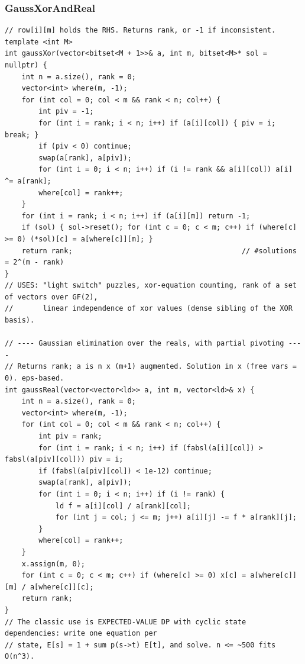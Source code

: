 \documentclass[9pt,a4paper,twocolumn]{extarticle}
\begin{document}
\filbreak
\subsubsection{GaussXorAndReal}
\nopagebreak
\begin{lstlisting}
// row[i][m] holds the RHS. Returns rank, or -1 if inconsistent.
template <int M>
int gaussXor(vector<bitset<M + 1>>& a, int m, bitset<M>* sol = nullptr) {
    int n = a.size(), rank = 0;
    vector<int> where(m, -1);
    for (int col = 0; col < m && rank < n; col++) {
        int piv = -1;
        for (int i = rank; i < n; i++) if (a[i][col]) { piv = i; break; }
        if (piv < 0) continue;
        swap(a[rank], a[piv]);
        for (int i = 0; i < n; i++) if (i != rank && a[i][col]) a[i] ^= a[rank];
        where[col] = rank++;
    }
    for (int i = rank; i < n; i++) if (a[i][m]) return -1;
    if (sol) { sol->reset(); for (int c = 0; c < m; c++) if (where[c] >= 0) (*sol)[c] = a[where[c]][m]; }
    return rank;                                        // #solutions = 2^(m - rank)
}
// USES: "light switch" puzzles, xor-equation counting, rank of a set of vectors over GF(2),
//       linear independence of xor values (dense sibling of the XOR basis).

// ---- Gaussian elimination over the reals, with partial pivoting ----
// Returns rank; a is n x (m+1) augmented. Solution in x (free vars = 0). eps-based.
int gaussReal(vector<vector<ld>> a, int m, vector<ld>& x) {
    int n = a.size(), rank = 0;
    vector<int> where(m, -1);
    for (int col = 0; col < m && rank < n; col++) {
        int piv = rank;
        for (int i = rank; i < n; i++) if (fabsl(a[i][col]) > fabsl(a[piv][col])) piv = i;
        if (fabsl(a[piv][col]) < 1e-12) continue;
        swap(a[rank], a[piv]);
        for (int i = 0; i < n; i++) if (i != rank) {
            ld f = a[i][col] / a[rank][col];
            for (int j = col; j <= m; j++) a[i][j] -= f * a[rank][j];
        }
        where[col] = rank++;
    }
    x.assign(m, 0);
    for (int c = 0; c < m; c++) if (where[c] >= 0) x[c] = a[where[c]][m] / a[where[c]][c];
    return rank;
}
// The classic use is EXPECTED-VALUE DP with cyclic state dependencies: write one equation per
// state, E[s] = 1 + sum p(s->t) E[t], and solve. n <= ~500 fits O(n^3).
\end{lstlisting}
\end{document}
